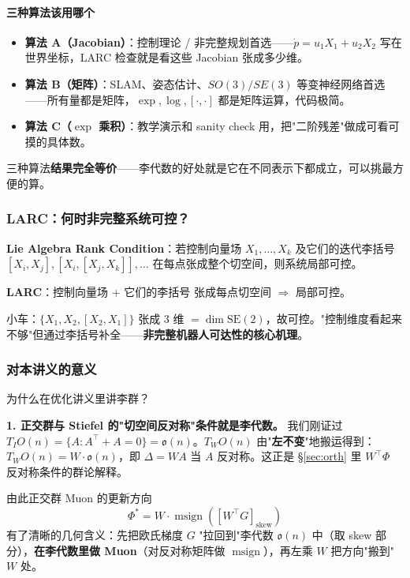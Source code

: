 \documentclass[11pt,a4paper]{article}
\theoremstyle{mythm}
\theoremstyle{mydef}
\newcommand{\msign}{\operatorname{msign}}
\begin{document}
\paragraph{三种算法该用哪个}
\begin{itemize}[leftmargin=2em]
\item \textbf{算法 A（Jacobian）}：控制理论 / 非完整规划首选——$\dot p = u_1 X_1 + u_2 X_2$ 写在世界坐标，LARC 检查就是看这些 Jacobian 张成多少维。
\item \textbf{算法 B（矩阵）}：SLAM、姿态估计、$SO(3)/SE(3)$ 等变神经网络首选——所有量都是矩阵，$\exp,\log,[\cdot,\cdot]$ 都是矩阵运算，代码极简。
\item \textbf{算法 C（$\exp$ 乘积）}：教学演示和 sanity check 用，把"二阶残差"做成可看可摸的具体数。
\end{itemize}
三种算法\textbf{结果完全等价}——李代数的好处就是它在不同表示下都成立，可以挑最方便的算。

\subsubsection*{LARC：何时非完整系统可控？}

\textbf{Lie Algebra Rank Condition}：若控制向量场 $X_1,\dots,X_k$ 及它们的迭代李括号 $[X_i,X_j], [X_i,[X_j,X_k]],\ldots$ 在每点张成整个切空间，则系统局部可控。

\begin{tcolorbox}[colback=blue!3,colframe=blue!50!black]
\textbf{LARC}：控制向量场 + 它们的李括号 张成每点切空间 $\Longrightarrow$ 局部可控。
\end{tcolorbox}

小车：$\{X_1, X_2, [X_2,X_1]\}$ 张成 3 维 $= \dim \mathrm{SE}(2)$，故可控。"控制维度看起来不够"但通过李括号补全——\textbf{非完整机器人可达性的核心机理}。

\subsubsection*{对本讲义的意义}

为什么在优化讲义里讲李群？

\textbf{1. 正交群与 Stiefel 的"切空间反对称"条件就是李代数。}
我们刚证过 $T_I O(n) = \{A : A^\top + A = 0\} = \mathfrak{o}(n)$。$T_W O(n)$ 由"\textbf{左不变}"地搬运得到：$T_W O(n) = W \cdot \mathfrak{o}(n)$，即 $\Delta = WA$ 当 $A$ 反对称。这正是 §\ref{sec:orth} 里 $W^\top\Phi$ 反对称条件的群论解释。

由此正交群 Muon 的更新方向
$$\Phi^* = W\cdot \msign\!\left([W^\top G]_{\mathrm{skew}}\right)$$
有了清晰的几何含义：先把欧氏梯度 $G$ "拉回到"李代数 $\mathfrak{o}(n)$ 中（取 skew 部分），\textbf{在李代数里做 Muon}（对反对称矩阵做 $\msign$），再左乘 $W$ 把方向"搬到" $W$ 处。
\end{document}
